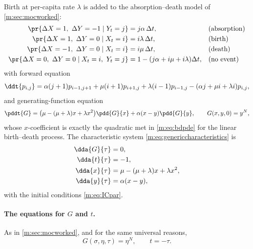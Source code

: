 Birth at per-capita rate $\lambda$ is added to the absorption--death model of
\cref{m:sec:mocworked}:
\begin{align*}
\pr{\Delta X=1,\ \Delta Y=-1\mid Y_t=j} &= j\alpha\,\Delta t, &&\text{(absorption)}\\
\pr{\Delta X=1,\ \Delta Y=0\mid X_t=i} &= i\lambda\,\Delta t, &&\text{(birth)}\\
\pr{\Delta X=-1,\ \Delta Y=0\mid X_t=i} &= i\mu\,\Delta t, &&\text{(death)}\\
\pr{\Delta X=0,\ \Delta Y=0\mid X_t=i,\ Y_t=j} &= 1-(j\alpha+i\mu+i\lambda)\Delta t, &&\text{(no event)}
\end{align*}
with forward equation
\begin{equation}
\label{m:eq:FK3}
\ddt{p_{i,j}} = \alpha(j+1)p_{i-1,j+1} + \mu(i+1)p_{i+1,j} + \lambda(i-1)p_{i-1,j}
- (\alpha j+\mu i+\lambda i)p_{i,j},
\end{equation}
and generating-function equation
\begin{equation}
\label{m:eq:PDE3}
\pddt{G} = \bigl(\mu-(\mu+\lambda)x+\lambda x^2\bigr)\pdd{G}{x}
+ \alpha(x-y)\pdd{G}{y},
\qquad
G(x,y,0)=y^N ,
\end{equation}
whose $x$-coefficient is exactly the quadratic met in \cref{m:eq:bdpde} for the
linear birth--death process. The characteristic system
\cref{m:eq:genericcharacteristics} is
\begin{align}
\dda{G}{\tau} &= 0, \label{m:eq:ch21}\\
\dda{t}{\tau} &= -1, \label{m:eq:ch22}\\
\dda{x}{\tau} &= \mu-(\mu+\lambda)x+\lambda x^2, \label{m:eq:ch23}\\
\dda{y}{\tau} &= \alpha(x-y), \label{m:eq:ch24}
\end{align}
with the initial conditions \cref{m:eq:ICpar}.

\paragraph{The equations for $G$ and $t$.}
As in \cref{m:sec:mocworked}, and for the same universal reasons,
\begin{equation}
\label{m:eq:GetaN2}
G(\sigma,\eta,\tau) = \eta^N,
\qquad
t = -\tau .
\end{equation}


